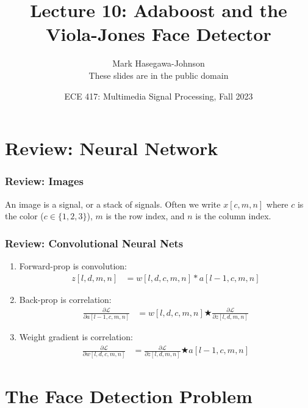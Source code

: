 \documentclass{beamer}
\title{Lecture 10: Adaboost and the Viola-Jones Face Detector}
\author{Mark Hasegawa-Johnson\\These slides are in the public domain}
\date{ECE 417: Multimedia Signal Processing, Fall 2023}
\begin{document}
\begin{frame}
  \maketitle
\end{frame}

\begin{frame}
  \tableofcontents
\end{frame}


\section[Review]{Review: Neural Network}
\setcounter{subsection}{1}

\begin{frame}
  \frametitle{Review: Images}

  An image is a signal, or a stack of signals.  Often we write
  $x[c,m,n]$ where $c$ is the color ($c\in\{1,2,3\}$), $m$ is the row
  index, and $n$ is the column index.
\end{frame}
  
\begin{frame}
  \frametitle{Review: Convolutional Neural Nets}
  \begin{enumerate}
  \item Forward-prop is convolution:
    \begin{align*}
      z[l,d,m,n] &= w[l,d,c,m,n] \ast a[l-1,c,m,n]
    \end{align*}
  \item Back-prop is correlation:
    \begin{align*}
      \frac{\partial{\mathcal L}}{\partial a[l-1,c,m,n]} &=
      w[l,d,c,m,n] \bigstar \frac{\partial{\mathcal L}}{\partial z[l,d,m,n]}
    \end{align*}
  \item Weight gradient is correlation:
    \begin{align*}
      \frac{\partial{\mathcal L}}{\partial w[l,d,c,m,n]} &=
      \frac{\partial{\mathcal L}}{\partial z[l,d,m,n]} \bigstar a[l-1,c,m,n]
    \end{align*}
  \end{enumerate}
\end{frame}

\section[Detection]{The Face Detection Problem}
\setcounter{subsection}{1}
\end{document}
